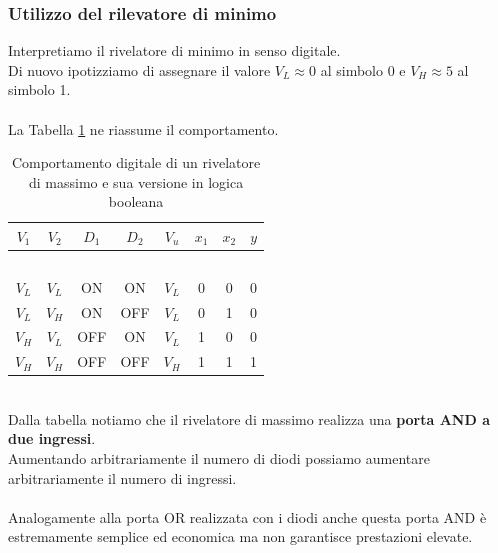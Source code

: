 \documentclass[../main.tex]{subfiles}
\begin{document}
	\subsubsection{Utilizzo del rilevatore di minimo}
	Interpretiamo il rivelatore di minimo in senso digitale. \\
	Di nuovo ipotizziamo di assegnare il valore $V_L \approx 0$ al simbolo 0 e $V_H \approx 5$ al simbolo 1.\\\\
	La Tabella \ref{tab:table-4} ne riassume il comportamento.
	\begin{table}[ht]
		\centering
		\begin{tabular}{|c|c|c|c|c|c|c|c|}
			\hline
			$V_1$ & $V_2$ & $D_1$ & $D_2$ & $V_u$ & $x_1$ & $x_2$ & $y$ \\
			\hline
			\multicolumn{8}{|c|}{$\quad$}\\[-0.8em] \hline%
			$V_L$ & $V_L$ & ON  & ON  & $V_L$ & 0 & 0 & 0 \\ \hline
			$V_L$ & $V_H$ & ON  & OFF & $V_L$ & 0 & 1 & 0 \\ \hline
			$V_H$ & $V_L$ & OFF & ON  & $V_L$ & 1 & 0 & 0 \\ \hline
			$V_H$ & $V_H$ & OFF & OFF & $V_H$ & 1 & 1 & 1 \\ 
			\hline
		\end{tabular}
		\caption{Comportamento digitale di un rivelatore di massimo e sua versione in logica booleana}
		\label{tab:table-4}
	\end{table}
	\\Dalla tabella notiamo che il rivelatore di massimo realizza una \textbf{porta AND a due ingressi}.\\
	Aumentando arbitrariamente il numero di diodi possiamo aumentare arbitrariamente il numero di ingressi.\\\\
	Analogamente alla porta OR realizzata con i diodi anche questa porta AND è estremamente semplice ed economica ma non garantisce prestazioni elevate.
\end{document}
